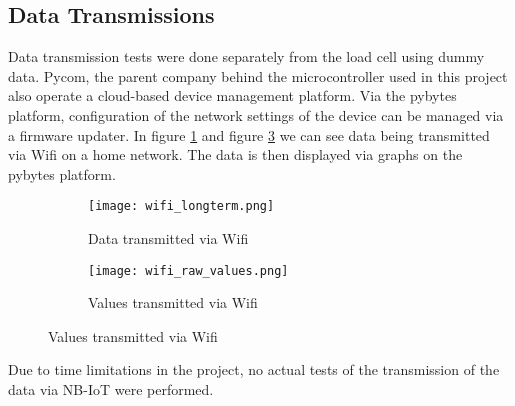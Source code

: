 \subsection{Data Transmissions}
Data transmission tests were done separately from the load cell using dummy data. Pycom, the parent company behind the microcontroller used in this project also operate a cloud-based device management platform. \cite{pybytes-website} Via the pybytes platform, configuration of the network settings of the device can be managed via a firmware updater. 
In figure \ref{fig:wifi_longterm} and figure \ref{fig:wifi_raw_values} we can see data being transmitted via Wifi on a home network. The data is then displayed via graphs on the pybytes platform.

\begin{figure}[H]
\centering
	\begin{subfigure}[b]{0.4\textwidth}
    \texttt{[image: wifi\_longterm.png]}
    \caption{Data transmitted via Wifi}
    \label{fig:wifi_longterm}
	\end{subfigure}
	\begin{subfigure}[b]{0.4\textwidth}
    \texttt{[image: wifi\_raw\_values.png]}
    \caption{Values transmitted via Wifi}
    \label{fig:wifi_raw_values}
	\end{subfigure}
\end{figure}

Due to time limitations in the project, no actual tests of the transmission of the data via NB-IoT were performed.
